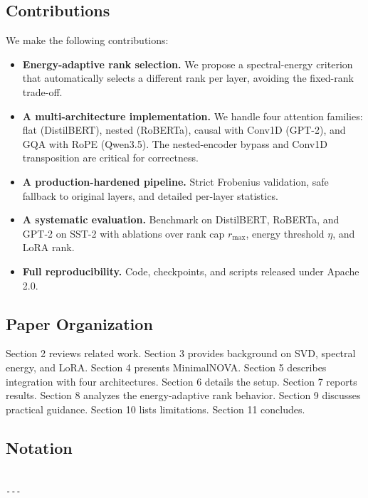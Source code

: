 \subsection{Contributions}

We make the following contributions:

\begin{itemize}
\item \textbf{Energy-adaptive rank selection.} We propose a spectral-energy criterion
  that automatically selects a different rank per layer, avoiding the
  fixed-rank trade-off.
\item \textbf{A multi-architecture implementation.} We handle four attention families:
  flat (DistilBERT), nested (RoBERTa), causal with Conv1D (GPT-2), and GQA
  with RoPE (Qwen3.5). The nested-encoder bypass and Conv1D transposition
  are critical for correctness.
\item \textbf{A production-hardened pipeline.} Strict Frobenius validation, safe
  fallback to original layers, and detailed per-layer statistics.
\item \textbf{A systematic evaluation.} Benchmark on DistilBERT, RoBERTa, and GPT-2
  on SST-2 with ablations over rank cap $r_\text{max}$, energy threshold
  $\eta$, and LoRA rank.
\item \textbf{Full reproducibility.} Code, checkpoints, and scripts released under
  Apache 2.0.

\end{itemize}
\subsection{Paper Organization}

Section 2 reviews related work. Section 3 provides background on SVD, spectral 
energy, and LoRA. Section 4 presents MinimalNOVA. Section 5 describes 
integration with four architectures. Section 6 details the setup. Section 7 
reports results. Section 8 analyzes the energy-adaptive rank behavior. 
Section 9 discusses practical guidance. Section 10 lists limitations. 
Section 11 concludes.



\subsection{Notation}

\begin{lstlisting}

---
\end{lstlisting}